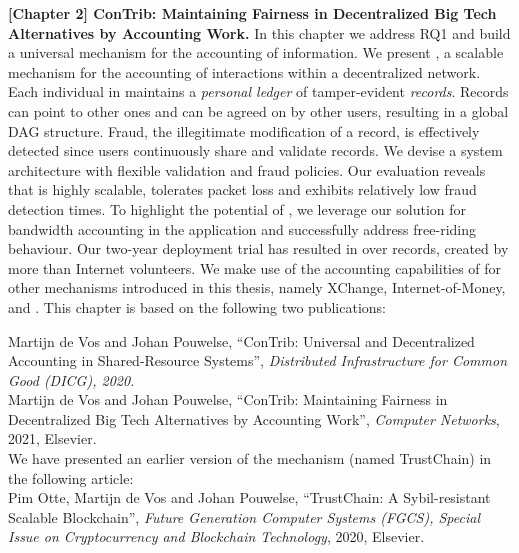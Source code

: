 \textbf{[Chapter 2] ConTrib: Maintaining Fairness in Decentralized Big Tech Alternatives by Accounting Work.}
In this chapter we address RQ1 and build a universal mechanism for the accounting of information.
We present \TrustChain{}, a scalable mechanism for the accounting of interactions within a decentralized network.
Each individual in \TrustChain{} maintains a \emph{personal ledger} of tamper-evident \emph{records}.
Records can point to other ones and can be agreed on by other users, resulting in a global DAG structure.
Fraud, the illegitimate modification of a record, is effectively detected since users continuously share and validate records.
We devise a system architecture with flexible validation and fraud policies.
Our evaluation reveals that \TrustChain{} is highly scalable, tolerates packet loss and exhibits relatively low fraud detection times.
To highlight the potential of \TrustChain{}, we leverage our solution for bandwidth accounting in the \Tribler{} application and successfully address free-riding behaviour.
Our two-year deployment trial has resulted in over \TrialRecords{} records, created by more than \TrialUsers{} Internet volunteers.
We make use of the accounting capabilities of \TrustChain{} for other mechanisms introduced in this thesis, namely XChange, Internet-of-Money, and \Dappcoder{}.
This chapter is based on the following two publications:

Martijn de Vos and Johan Pouwelse, \enquote{ConTrib: Universal and Decentralized Accounting in Shared-Resource Systems}, \emph{Distributed Infrastructure for Common Good (DICG), 2020.}\\

Martijn de Vos and Johan Pouwelse, \enquote{ConTrib: Maintaining Fairness in Decentralized Big Tech Alternatives by Accounting Work}, \emph{Computer Networks}, 2021, Elsevier.\\

\noindent We have presented an earlier version of the \TrustChain{} mechanism (named TrustChain) in the following article:\\

Pim Otte, Martijn de Vos and Johan Pouwelse, \enquote{TrustChain: A Sybil-resistant Scalable Blockchain}, \emph{Future Generation Computer Systems (FGCS), Special Issue on Cryptocurrency and Blockchain Technology}, 2020, Elsevier.\\

